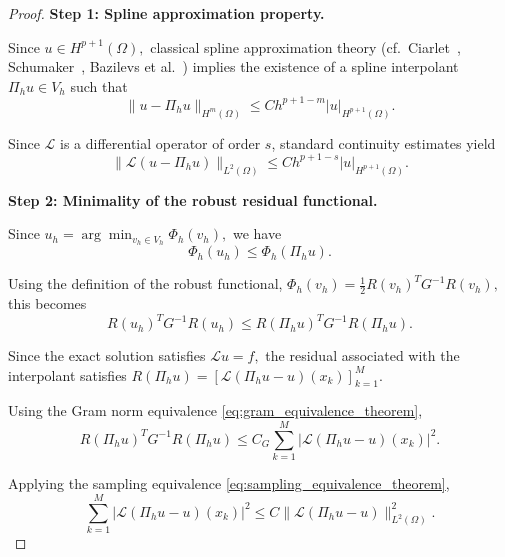\documentclass[review]{elsarticle}
\begin{document}
\begin{proof}

\noindent
\textbf{Step 1: Spline approximation property.}

Since
$
u\in H^{p+1}(\Omega),
$
classical spline approximation theory
(cf.\ Ciarlet~\cite{ciarlet2002finite},
Schumaker~\cite{schumaker2007spline},
Bazilevs et al.~\cite{bazilevs2006isogeometric})
implies the existence of a spline interpolant
$
\Pi_hu\in V_h
$
such that
\begin{equation}
\|u-\Pi_hu\|_{H^m(\Omega)}
\le
Ch^{p+1-m}
|u|_{H^{p+1}(\Omega)}.
\label{eq:proof_interp}
\end{equation}

Since $\mathcal{L}$ is a differential operator of order $s$,
standard continuity estimates yield
\begin{equation}
\|\mathcal{L}(u-\Pi_hu)\|_{L^2(\Omega)}
\le
Ch^{p+1-s}
|u|_{H^{p+1}(\Omega)}.
\label{eq:proof_operator_error}
\end{equation}


\noindent
\textbf{Step 2: Minimality of the robust residual functional.}

Since
$
u_h
=
\arg\min_{v_h\in V_h}
\Phi_h(v_h),
$
we have
\begin{equation}
\Phi_h(u_h)
\le
\Phi_h(\Pi_hu).
\label{eq:proof_minimality}
\end{equation}

Using the definition of the robust functional,
$
\Phi_h(v_h)
=
\frac12
R(v_h)^TG^{-1}R(v_h),
$
this becomes
\begin{equation}
R(u_h)^TG^{-1}R(u_h)
\le
R(\Pi_hu)^TG^{-1}R(\Pi_hu).
\label{eq:proof_robust_minimality}
\end{equation}

Since the exact solution satisfies
$
\mathcal{L}u=f,
$
the residual associated with the interpolant satisfies
$
R(\Pi_hu)
=
\left[
\mathcal{L}(\Pi_hu-u)(x_k)
\right]_{k=1}^{M}.
$

Using the Gram norm equivalence
\eqref{eq:gram_equivalence_theorem},
\begin{equation}
R(\Pi_hu)^TG^{-1}R(\Pi_hu)
\le
C_G
\sum_{k=1}^{M}
|\mathcal{L}(\Pi_hu-u)(x_k)|^2.
\label{eq:proof_gram_upper}
\end{equation}

Applying the sampling equivalence
\eqref{eq:sampling_equivalence_theorem},
\begin{equation}
\sum_{k=1}^{M}
|\mathcal{L}(\Pi_hu-u)(x_k)|^2
\le
C
\|\mathcal{L}(\Pi_hu-u)\|_{L^2(\Omega)}^2.
\label{eq:proof_sampling}
\end{equation}


\end{proof}
\end{document}
